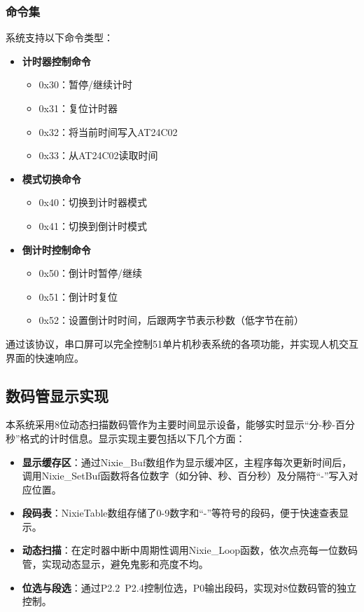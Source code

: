 \documentclass[12pt,hyperref,a4paper,UTF8]{ctexart}
\begin{document}
\subsubsection{命令集}

系统支持以下命令类型：

\begin{itemize}
  \item \textbf{计时器控制命令}
    \begin{itemize}
      \item 0x30：暂停/继续计时
      \item 0x31：复位计时器
      \item 0x32：将当前时间写入AT24C02
      \item 0x33：从AT24C02读取时间
    \end{itemize}
  
  \item \textbf{模式切换命令}
    \begin{itemize}
      \item 0x40：切换到计时器模式
      \item 0x41：切换到倒计时模式
    \end{itemize}
    
  \item \textbf{倒计时控制命令}
    \begin{itemize}
      \item 0x50：倒计时暂停/继续
      \item 0x51：倒计时复位
      \item 0x52：设置倒计时时间，后跟两字节表示秒数（低字节在前）
    \end{itemize}
\end{itemize}

通过该协议，串口屏可以完全控制51单片机秒表系统的各项功能，并实现人机交互界面的快速响应。

\subsection{数码管显示实现}

本系统采用8位动态扫描数码管作为主要时间显示设备，能够实时显示“分-秒-百分秒”格式的计时信息。显示实现主要包括以下几个方面：

\begin{itemize}
  \item \textbf{显示缓存区}：通过Nixie\_Buf数组作为显示缓冲区，主程序每次更新时间后，调用Nixie\_SetBuf函数将各位数字（如分钟、秒、百分秒）及分隔符“-”写入对应位置。
  \item \textbf{段码表}：NixieTable数组存储了0-9数字和“-”等符号的段码，便于快速查表显示。
  \item \textbf{动态扫描}：在定时器中断中周期性调用Nixie\_Loop函数，依次点亮每一位数码管，实现动态显示，避免鬼影和亮度不均。
  \item \textbf{位选与段选}：通过P2.2~P2.4控制位选，P0输出段码，实现对8位数码管的独立控制。
\end{itemize}
\end{document}
